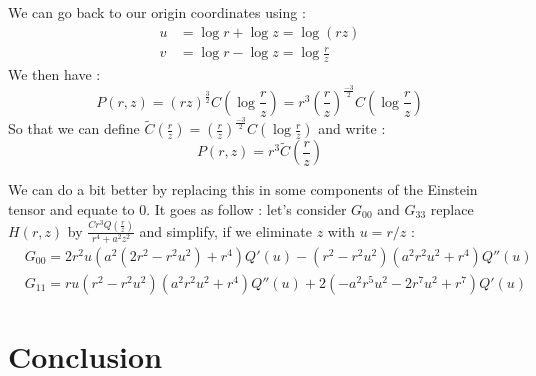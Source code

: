 \documentclass[a4paper,12pt]{article}
\theoremstyle{definition}
\begin{document}
We can go back to our origin coordinates using :
\begin{equation}
\begin{split}
	u&=\log{r} + \log{z}=\log{(rz)}\\
	v&=\log{r} - \log{z}=\log{\frac{r}{z}}
\end{split}
\end{equation}
We then have :
\begin{equation}
	P(r,z)=(rz)^\frac{3}{2}C(\log{\frac{r}{z}})=r^3(\frac{r}{z})^\frac{-3}{2}C(\log{\frac{r}{z}})
\end{equation}
So that we can define $\tilde C(\frac{r}{z})=(\frac{r}{z})^\frac{-3}{2}C(\log{\frac{r}{z}})$ and write :
\begin{equation}
	P(r,z)=r^3\tilde C(\frac{r}{z})
\end{equation}

We can do a bit better by replacing this in some components of the Einstein tensor and equate to $0$.
It goes as follow : let's consider $G_{00}$ and $G_{33}$ replace $H(r,z)$ by $\frac{Cr^3Q(\frac{r}{z})}{r^4+a^2z^2}$ and simplify, if we eliminate $z$ with $u=r/z$ :
\begin{align}
	&G_{00}=2 r^2 u (a^2 (2 r^2-r^2 u^2)+r^4)Q'(u)-(r^2-r^2 u^2) (a^2 r^2u^2+r^4) Q''(u)\\
	&G_{11}=r u (r^2-r^2 u^2) (a^2 r^2u^2+r^4) Q''(u)+2 (-a^2 r^5 u^2-2r^7 u^2+r^7) Q'(u)
\end{align}

\section{Conclusion}
\end{document}
